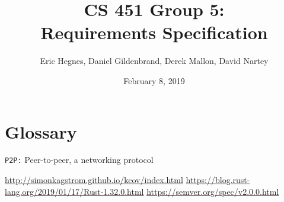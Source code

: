 \documentclass[titlepage]{article}
\title{CS 451 Group 5:\\
Requirements Specification}
\author{Eric Hegnes, Daniel Gildenbrand, Derek Mallon, David Nartey}
\date{February 8, 2019}
\begin{document}
\maketitle
\tableofcontents











\section{Glossary}
\texttt{P2P:} Peer-to-peer, a networking protocol

\begin{thebibliography}{1}
   \url{http://simonkagstrom.github.io/kcov/index.html}
   \url{https://blog.rust-lang.org/2019/01/17/Rust-1.32.0.html}
   \url{https://semver.org/spec/v2.0.0.html}
\end{thebibliography}
\end{document}
